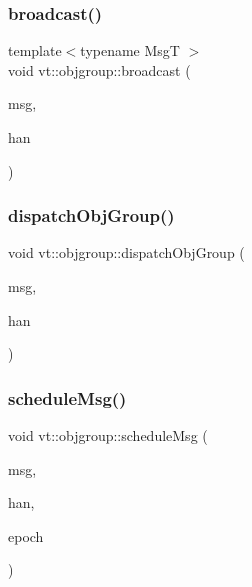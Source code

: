 \subsubsection{\texorpdfstring{broadcast()}{broadcast()}}
{\footnotesize\ttfamily template$<$typename MsgT $>$ \\
void vt\+::objgroup\+::broadcast (\begin{DoxyParamCaption}\item[{\hyperlink{namespacevt_ab2b3d506ec8e8d1540aede826d84a239}{Msg\+Shared\+Ptr}$<$ MsgT $>$}]{msg,  }\item[{\hyperlink{namespacevt_af64846b57dfcaf104da3ef6967917573}{Handler\+Type}}]{han }\end{DoxyParamCaption})}

\mbox{\label{namespacevt_1_1objgroup_a8eab3eb6e73bbc92bce100e13a01a795}} 
\subsubsection{\texorpdfstring{dispatch\+Obj\+Group()}{dispatchObjGroup()}}
{\footnotesize\ttfamily void vt\+::objgroup\+::dispatch\+Obj\+Group (\begin{DoxyParamCaption}\item[{\hyperlink{namespacevt_ab2b3d506ec8e8d1540aede826d84a239}{Msg\+Shared\+Ptr}$<$ \hyperlink{namespacevt_a1125ac1da6c0bbf141e0ea0739d7602d}{Short\+Message} $>$}]{msg,  }\item[{\hyperlink{namespacevt_af64846b57dfcaf104da3ef6967917573}{Handler\+Type}}]{han }\end{DoxyParamCaption})}

\mbox{\label{namespacevt_1_1objgroup_ab154142df9cf5401462e1b4cabb3b480}} 
\subsubsection{\texorpdfstring{schedule\+Msg()}{scheduleMsg()}}
{\footnotesize\ttfamily void vt\+::objgroup\+::schedule\+Msg (\begin{DoxyParamCaption}\item[{\hyperlink{namespacevt_ab2b3d506ec8e8d1540aede826d84a239}{Msg\+Shared\+Ptr}$<$ \hyperlink{namespacevt_a1125ac1da6c0bbf141e0ea0739d7602d}{Short\+Message} $>$}]{msg,  }\item[{\hyperlink{namespacevt_af64846b57dfcaf104da3ef6967917573}{Handler\+Type}}]{han,  }\item[{\hyperlink{namespacevt_a985a5adf291c34a3ca263b3378388236}{Epoch\+Type}}]{epoch }\end{DoxyParamCaption})}

